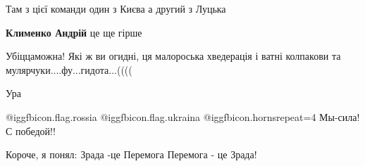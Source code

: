 \begin{itemize}
\begin{itemize}
Там з цієї команди один з Києва а другий з Луцька

\begin{itemize} %
\textbf{Клименко Андрій} це ще гірше
\end{itemize} %

\end{itemize} %

Убіццаможна! Які ж ви огидні, ця малороська хведерація і ватні колпакови та мулярчуки....фу...гидота...((((

Ура

@igg{fbicon.flag.rossia} @igg{fbicon.flag.ukraina}  @igg{fbicon.horns}{repeat=4}  Мы-сила! С победой!!

Короче, я понял:
Зрада -це Перемога
Перемога - це Зрада!

\end{itemize} %
